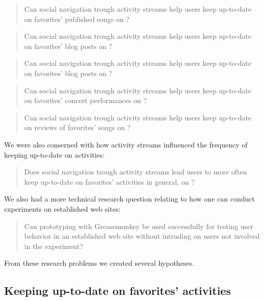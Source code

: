 \begin{quote}
  Can social navigation trough activity streams help users keep
  up-to-date on favorites' published songs on \urort{}?
\end{quote}

\begin{quote}
  Can social navigation trough activity streams help users keep
  up-to-date on favorites' blog posts on \urort{}?
\end{quote}

\begin{quote}
  Can social navigation trough activity streams help users keep
  up-to-date on favorites' blog posts on \urort{}?
\end{quote}

\begin{quote}
  Can social navigation trough activity streams help users keep
  up-to-date on favorites' concert performances on \urort{}?
\end{quote}

\begin{quote}
  Can social navigation trough activity streams help users keep
  up-to-date on reviews of favorites' songs on \urort{}?
\end{quote}

We were also conserned with how activity streams influenced the
frequency of keeping up-to-date on activities:

\begin{quote}
  Does social navigation trough activity streams lead users to more often keep
  up-to-date on favorites' activities in general, on \urort{}?
\end{quote}

We also had a more technical research question relating to how one can
conduct experiments on established web sites:

\begin{quote}
  Can prototyping with Greasemonkey be used successfully
  for testing user behavior in an established web site without
  intruding on users not involved in the experiment?
\end{quote}

From these research problems we created several hypotheses.

\subsection{Keeping up-to-date on favorites' activities}

